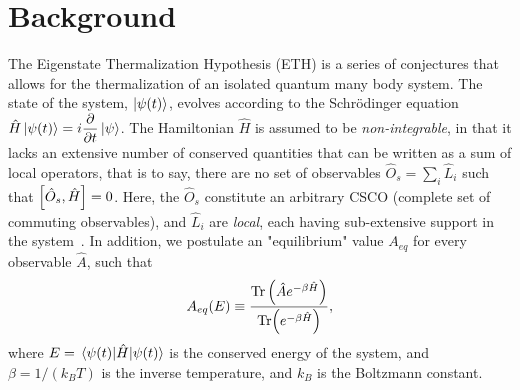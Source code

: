 \documentclass[%
reprint,
superscriptaddress,
amsmath,amssymb,
aps,
prb,
showkeys,
]{revtex4-2}
\begin{document}
\section{\label{sec:background} Background}

The Eigenstate Thermalization Hypothesis (ETH) is a series of conjectures that allows for the thermalization of an isolated quantum many body system. The state of the system, $\ket{\psi(t)}$, evolves according to the Schr\"odinger equation $\hat{H}\ket{\psi(t)} = i\displaystyle\frac{\partial}{\partial t}\ket{\psi}$. The Hamiltonian $\hat{H}$ is assumed to be \textit{non-integrable}, in that  {it lacks an extensive number of conserved quantities that can be written as a sum of local operators, that is to say, there are no set of observables   $\hat{O}_s = \sum_i \hat{L}_i$ such that $\comm{\hat{O}_s}{\hat{H}}=0$. Here, the $\hat{O}_s$ constitute an arbitrary CSCO (complete set of commuting observables), and $\hat{L}_i$ are \textit{local}, each having sub-extensive support in the system}~\cite{Sutherland2004}. In addition, we postulate an "equilibrium" value $A_{eq}$ for every observable $\hat{A}$, such that
\begin{equation}
	\label{eq:aeq}
	A_{eq}(E)\equiv \frac{\Tr \left(\hat{A}e^{-\beta \hat{H}}\right)}{\Tr(e^{-\beta \hat{H}})},
\end{equation}
where $E=\expval{\hat{H}}{\psi(t)}$ is the conserved energy of the system, and $\beta = 1/(k_B T)$ is the inverse temperature, and $k_B$ is the Boltzmann constant.
\end{document}

